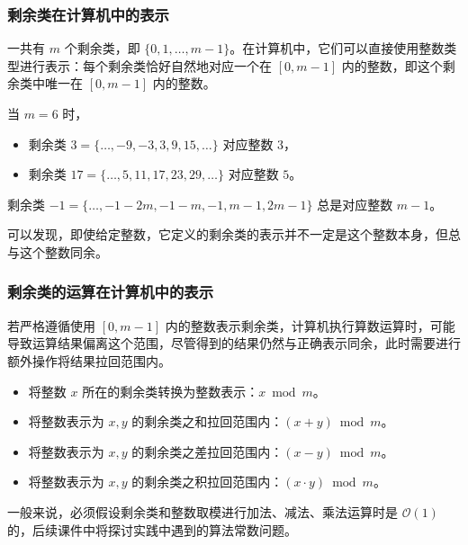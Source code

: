 \documentclass{../pkslide}
\begin{document}
\begin{frame}
  \frametitle{剩余类在计算机中的表示}
  一共有 $m$ 个剩余类，即 $\{ 0, 1, \ldots, m - 1 \}$。在计算机中，它们可以直接使用整数类型进行表示：每个剩余类恰好自然地对应一个在 $[0, m - 1]$ 内的整数，即这个剩余类中唯一在 $[0, m - 1]$ 内的整数。
  
  \pause
  \begin{example}
    当 $m = 6$ 时，
    
    \begin{itemize}
      \item 剩余类 $3 = \{ \ldots, -9, -3, 3, 9, 15, \ldots \}$ 对应整数 $3$，
      \item 剩余类 $17 = \{ \ldots, 5, 11, 17, 23, 29, \ldots \}$ 对应整数 $5$。
    \end{itemize}
    
    \pause
    剩余类 $-1 = \{ \ldots, -1 - 2 m, -1 - m, -1, m - 1, 2 m - 1 \}$ 总是对应整数 $m - 1$。
  \end{example}
  
  \pause
  可以发现，即使给定整数，它定义的剩余类的表示并不一定是这个整数本身，但总与这个整数同余。
\end{frame}

\begin{frame}
  \frametitle{剩余类的运算在计算机中的表示}
  若严格遵循使用 $[0, m - 1]$ 内的整数表示剩余类，计算机执行算数运算时，可能导致运算结果偏离这个范围，尽管得到的结果仍然与正确表示同余，此时需要进行额外操作将结果拉回范围内。
  
  \begin{itemize}
    \item 将整数 $x$ 所在的剩余类转换为整数表示：$x \bmod m$。
    \item 将整数表示为 $x, y$ 的剩余类之和拉回范围内：$(x + y) \bmod m$。
    \item 将整数表示为 $x, y$ 的剩余类之差拉回范围内：$(x - y) \bmod m$。
    \item 将整数表示为 $x, y$ 的剩余类之积拉回范围内：$(x \cdot y) \bmod m$。
  \end{itemize}
  
  \pause
  \emptyline
  一般来说，必须假设剩余类和整数取模进行加法、减法、乘法运算时是 $\mathcal O (1)$ 的，后续课件中将探讨实践中遇到的算法常数问题。
\end{frame}
\end{document}
